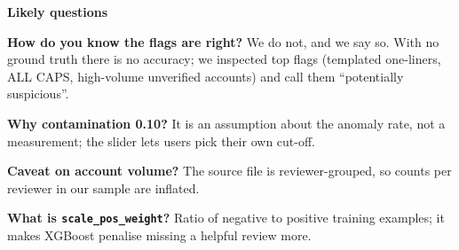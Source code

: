 \documentclass[10pt,a4paper]{article}
\begin{document}
\par\vspace{2pt}\textbf{Likely questions}\par\vspace{1pt}
\begin{qa}\textbf{How do you know the flags are right?} We do not, and we say so. With no ground truth there is no accuracy; we inspected top flags (templated one-liners, ALL CAPS, high-volume unverified accounts) and call them ``potentially suspicious''.\end{qa}\vspace{2pt}
\begin{qa}\textbf{Why contamination 0.10?} It is an assumption about the anomaly rate, not a measurement; the slider lets users pick their own cut-off.\end{qa}\vspace{2pt}
\begin{qa}\textbf{Caveat on account volume?} The source file is reviewer-grouped, so counts per reviewer in our sample are inflated.\end{qa}\vspace{2pt}
\begin{qa}\textbf{What is \texttt{scale\_pos\_weight}?} Ratio of negative to positive training examples; it makes XGBoost penalise missing a helpful review more.\end{qa}
\newpage
\end{document}
